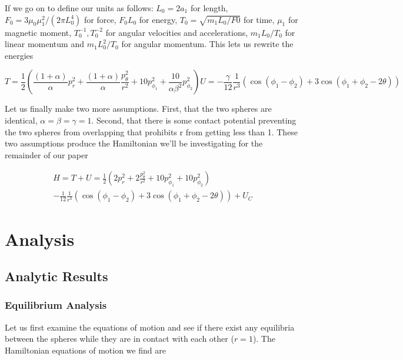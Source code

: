 \documentclass[prb,preprint]{revtex4-1}
\begin{document}
If we go on to define our units as follows: 
$L_0=2a_1$ for length,
$F_0=3\mu_0 \mu_1^2/(2\pi L_0^4)$ for force,
$F_0L_0$ for energy,
$T_0=\sqrt{m_1L_0/F0}$ for time,
$\mu_1$ for magnetic moment,
$T_0^{-1},T_0^{-2}$ for angular velocities and accelerations,
$m_1L_0/T_0$ for linear momentum and 
$m_1L_0^2/T_0$ for angular momentum. This lets us rewrite the energies

\begin{subequations}
    \begin{equation}
        T=\frac{1}{2}\left (
	\frac{(1+\alpha)}{\alpha } p_r^2
	+\frac{(1+\alpha)}{\alpha } \frac{p_\theta^2}{r^2}
	+10 p_{\phi_1}^2 
	+\frac{10}{\alpha\beta^2} p_{\phi_2}^2      
        \right )
    \end{equation}
    \begin{equation}
        U=
	    -\frac{\gamma}{12}
	    \frac{1}{r^3}(
	        \cos(\phi_1-\phi_2)
	        +3\cos(\phi_1+\phi_2 -2\theta)
	    )
    \end{equation}
\end{subequations}

Let us finally make two more assumptions. First, that the two spheres are identical, $\alpha=\beta=\gamma=1$. Second, that there is some contact potential preventing the two spheres from overlapping that prohibits r from getting less than 1. These two assumptions produce the Hamiltonian we'll be investigating for the remainder of our paper

\begin{equation}
  \begin{multlined}
	H=T+U=
	\frac{1}{2}\left (
	2 p_r^2
	+2 \frac{p_\theta^2}{r^2}
	+10 p_{\phi_1}^2 
	+10 p_{\phi_2}^2      
        \right )
        \\
	-
	\frac{1}{12}
	\frac{1}{r^3}(
	        \cos(\phi_1-\phi_2)
	        +3\cos(\phi_1+\phi_2 -2\theta)
	    )+U_C
  \end{multlined}
\end{equation}

\section{Analysis}
\subsection{Analytic Results}

\subsubsection{Equilibrium Analysis}
Let us first examine the equations of motion and see if there exist any equilibria between the spheres while they are in contact with each other ($r=1$). The Hamiltonian equations of motion we find are
\end{document}
